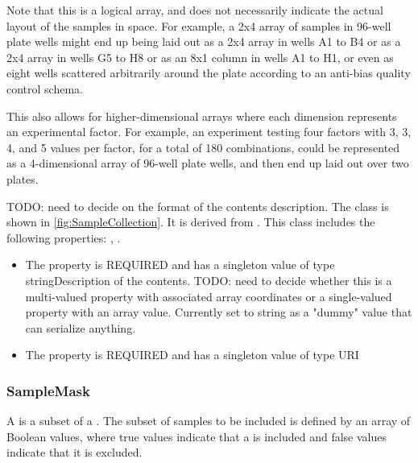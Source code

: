         Note that this is a logical array, and does not necessarily indicate the actual layout of the samples in space.
        For example, a 2x4 array of samples in 96-well plate wells might end up being laid out as a 2x4 array in wells
        A1 to B4 or as a 2x4 array in wells G5 to H8 or as an 8x1 column in wells A1 to H1, or even as eight wells
        scattered arbitrarily around the plate according to an anti-bias quality control schema.

        This also allows for higher-dimensional arrays where each dimension represents an experimental factor.
        For example, an experiment testing four factors with 3, 3, 4, and 5 values per factor, for a total of 180
        combinations, could be represented as a 4-dimensional  array of 96-well plate wells, and then end up
        laid out over two plates.

        TODO: need to decide on the format of the contents description.%
\newline%
\linebreak%
The  class is shown in \ref{fig:SampleCollection}. It is derived from .%
This class includes the following properties: , . %
\begin{itemize}%
\item%
The  property is REQUIRED and has a singleton value of type stringDescription of the contents.
        TODO: need to decide whether this is a multi-valued property with associated array coordinates or a
        single-valued property with an array value.
        Currently set to string as a "dummy" value that can serialize anything.%
\item%
The  property is REQUIRED and has a singleton value of type URI%
\end{itemize}%
\subsubsection{SampleMask}%
\label{sec:labop:SampleMask}%
A  is a subset of a . The subset of samples to be included is defined
        by an array of Boolean values, where true values indicate that a  is included and false values indicate
        that it is excluded.

